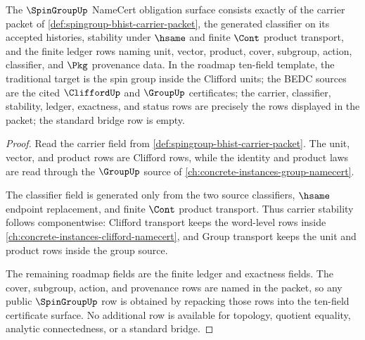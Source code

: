 \begin{theorem}
\label{thm:spingroup-root-obligation-surface}
The $\SpinGroupUp$ NameCert obligation surface consists exactly of the carrier
packet of \autoref{def:spingroup-bhist-carrier-packet}, the generated
classifier on its accepted histories, stability under $\hsame$ and finite
$\Cont$ product transport, and the finite ledger rows naming unit, vector,
product, cover, subgroup, action, classifier, and $\Pkg$ provenance data.
In the roadmap ten-field template, the traditional target is the spin group
inside the Clifford units; the BEDC sources are the cited $\CliffordUp$ and
$\GroupUp$ certificates; the carrier, classifier, stability, ledger,
exactness, and status rows are precisely the rows displayed in the packet;
the standard bridge row is empty.
\end{theorem}
\begin{proof}
Read the carrier field from
\autoref{def:spingroup-bhist-carrier-packet}. The unit, vector, and product
rows are Clifford rows, while the identity and product laws are read through
the $\GroupUp$ source of \autoref{ch:concrete-instances-group-namecert}.

The classifier field is generated only from the two source classifiers,
$\hsame$ endpoint replacement, and finite $\Cont$ product transport. Thus
carrier stability follows componentwise: Clifford transport keeps the
word-level rows inside \autoref{ch:concrete-instances-clifford-namecert}, and
Group transport keeps the unit and product rows inside the group source.

The remaining roadmap fields are the finite ledger and exactness fields. The
cover, subgroup, action, and provenance rows are named in the packet, so any
public $\SpinGroupUp$ row is obtained by repacking those rows into the
ten-field certificate surface. No additional row is available for topology,
quotient equality, analytic connectedness, or a standard bridge.
\end{proof}

